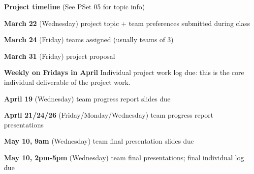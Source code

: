 \documentclass[12pt,letterpaper,noanswers]{exam}
\begin{document}
\vfill

\noindent\textbf{Project timeline} (See PSet 05 for topic info)

\noindent\textbf{March 22} (Wednesday) project topic + team preferences submitted during class

\noindent\textbf{March 24} (Friday) teams assigned (usually teams of 3)

\noindent\textbf{March 31} (Friday) project proposal

\noindent\textbf{Weekly on Fridays in April} Individual project work log due: this is the core individual deliverable of the project work.

\noindent\textbf{April 19} (Wednesday) team progress report slides due

\noindent\textbf{April 21/24/26} (Friday/Monday/Wednesday) team progress report presentations

\noindent\textbf{May 10, 9am} (Wednesday) team final presentation slides due

\noindent\textbf{May 10, 2pm-5pm} (Wednesday) team final presentations; final individual log due
\end{document}
